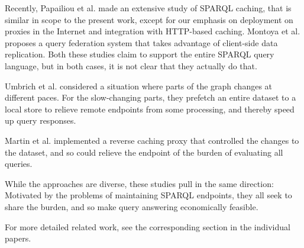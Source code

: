 Recently, Papailiou et al. \cite{papailiou2015graph} made an extensive
study of SPARQL caching, that is similar in scope to the present work,
except for our emphasis on deployment on proxies in the Internet and
integration with HTTP-based caching.  Montoya et
al. \cite{DBLP:journals/corr/MontoyaSMV15} proposes a query federation
system that takes advantage of client-side data replication. Both
these studies claim to support the entire SPARQL query language, but
in both cases, it is not clear that they actually do that.

Umbrich et al. \cite{umbrich2012hybrid} considered a situation where
parts of the graph changes at different paces. For the slow-changing
parts, they prefetch an entire dataset to a local store to relieve
remote endpoints from some processing, and thereby speed up query
responses. 

Martin et al. \cite{sparqlproxy} implemented a reverse caching proxy
that controlled the changes to the dataset, and so could relieve the
endpoint of the burden of evaluating all queries.

While the approaches are diverse, these studies pull in the same
direction: Motivated by the problems of maintaining SPARQL endpoints,
they all seek to share the burden, and so make query answering
economically feasible.

For more detailed related work, see the corresponding section in the
individual papers.
